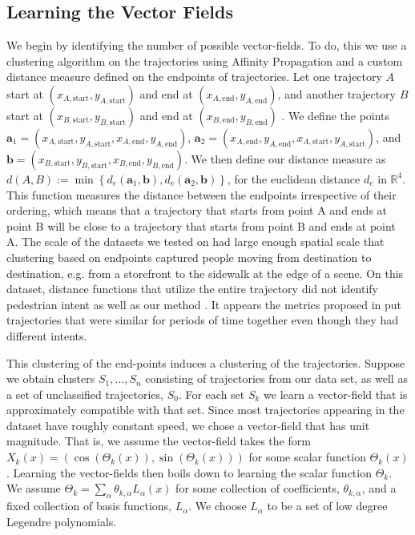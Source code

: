 \documentclass[letterpaper,10pt,conference]{ieeetran}
\begin{document}
  \subsection{Learning the Vector Fields}
 We begin by identifying the number of possible vector-fields.
To do, this we use a clustering algorithm on the trajectories using Affinity Propagation \cite{FreyDueck2007} and a custom distance measure defined on the endpoints of trajectories. 
	Let one trajectory $A$ start at $(x_{A,\mathrm{start}}, y_{A,\mathrm{start}})$ and end at  $(x_{A,\mathrm{end}}, y_{A,\mathrm{end}})$, and another trajectory $B$ start at $(x_{B,\mathrm{start}}, y_{B,\mathrm{start}})$ and end at $(x_{B,\mathrm{end}}, y_{B,\mathrm{end}})$ . 
	We define the points $\mathbf{a}_1 = (x_{A, \mathrm{start}}, y_{A, \mathrm{start}}, x_{A, \mathrm{end}}, y_{A, \mathrm{end}})$, $\mathbf{a}_2 = (x_{A, \mathrm{end}}, y_{A, \mathrm{end}}, x_{A, \mathrm{start}}, y_{A, \mathrm{start}})$, and $\mathbf{b} = (x_{B, \mathrm{start}}, y_{B, \mathrm{start}}, x_{B, \mathrm{end}}, y_{B, \mathrm{end}})$. 
	We then define our distance measure as $d(A, B) :=  \min \left\{ d_e(\mathbf{a}_1, \mathbf{b}), d_e(\mathbf{a}_2, \mathbf{b}) \right\}$, for the euclidean distance $d_e$ in $\mathbb{R}^4$. 
	This function measures the distance between the endpoints irrespective of their ordering, which means that a trajectory that starts from point A and ends at point B will be close to a trajectory that starts from point B and ends at point A.
	The scale of the datasets we tested on had large enough spatial scale that clustering based on endpoints captured people moving from destination to destination, e.g. from a storefront to the sidewalk at the edge of a scene. 
	On this dataset, distance functions that utilize the entire trajectory did not identify pedestrian intent as well as our method \cite{Morris2009,Lee2007}. 
	It appears the metrics proposed in \cite{Morris2009} put trajectories that were similar for periods of time together even though they had different intents.
	
	This clustering of the end-points induces a clustering of the trajectories.
  Suppose we obtain clusters $S_1, \dots, S_n$ consisting of trajectories from our data set, as well as a set of unclassified trajectories, $S_0$.
  For each set $S_k$ we learn a vector-field that is approximately compatible with that set.
  Since most trajectories appearing in the dataset have roughly constant speed, we chose a vector-field that has unit magnitude. 
  That is, we assume the vector-field takes the form $X_k(x) = \left( \cos( \Theta_k(x) ) , \sin(\Theta_k(x)) \right)$ for some scalar function $\Theta_k(x)$.
  Learning the vector-fields then boils down to learning the scalar function $\Theta_k$.
  We assume $\Theta_k = \sum_{\alpha} \theta_{k,\alpha} L_{\alpha}(x)$ for some collection of coefficients, $\theta_{k,\alpha}$, and a fixed collection of basis functions, $L_{\alpha}$.
  We choose $L_{\alpha}$ to be a set of low degree Legendre polynomials.
 
\end{document}

